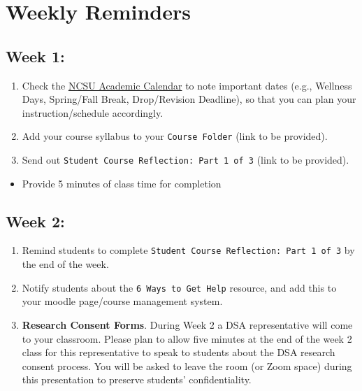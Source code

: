 \documentclass[
]{book}
\providecommand{\tightlist}{%
  \setlength{\itemsep}{0pt}\setlength{\parskip}{0pt}}
\begin{document}
\hypertarget{weekly-reminders}{%
\section{Weekly Reminders}\label{weekly-reminders}}

\hypertarget{week-1}{%
\subsection{Week 1:}\label{week-1}}

\begin{enumerate}
\def\labelenumi{\arabic{enumi})}
\item
  Check the \href{https://studentservices.ncsu.edu/calendars/academic/}{NCSU Academic Calendar} to note important dates (e.g., Wellness Days, Spring/Fall Break, Drop/Revision Deadline), so that you can plan your instruction/schedule accordingly.
\item
  Add your course syllabus to your \texttt{Course\ Folder} (link to be provided).
\item
  Send out \texttt{Student\ Course\ Reflection:\ Part\ 1\ of\ 3} (link to be provided).
\end{enumerate}

\begin{itemize}
\tightlist
\item
  Provide 5 minutes of class time for completion
\end{itemize}

\hypertarget{week-2}{%
\subsection{Week 2:}\label{week-2}}

\begin{enumerate}
\def\labelenumi{\arabic{enumi})}
\item
  Remind students to complete \texttt{Student\ Course\ Reflection:\ Part\ 1\ of\ 3} by the end of the week.
\item
  Notify students about the \texttt{6\ Ways\ to\ Get\ Help} resource, and add this to your moodle page/course management system.
\item
  \textbf{Research Consent Forms}. During Week 2 a DSA representative will come to your classroom. Please plan to allow five minutes at the end of the week 2 class for this representative to speak to students about the DSA research consent process. You will be asked to leave the room (or Zoom space) during this presentation to preserve students' confidentiality.
\end{enumerate}
\end{document}
